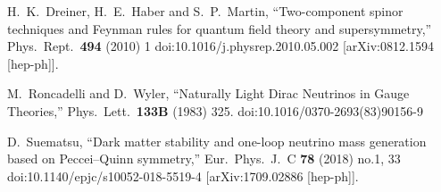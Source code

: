 \begin{thebibliography}{99}
  H.~K.~Dreiner, H.~E.~Haber and S.~P.~Martin,
  ``Two-component spinor techniques and Feynman rules for quantum field theory and supersymmetry,''
  Phys.\ Rept.\  {\bf 494} (2010) 1
  doi:10.1016/j.physrep.2010.05.002
  [arXiv:0812.1594 [hep-ph]].

  M.~Roncadelli and D.~Wyler,
  ``Naturally Light Dirac Neutrinos in Gauge Theories,''
  Phys.\ Lett.\  {\bf 133B} (1983) 325.
  doi:10.1016/0370-2693(83)90156-9
  
  D.~Suematsu,
  ``Dark matter stability and one-loop neutrino mass generation based on Peccei–Quinn symmetry,''
  Eur.\ Phys.\ J.\ C {\bf 78} (2018) no.1,  33
  doi:10.1140/epjc/s10052-018-5519-4
  [arXiv:1709.02886 [hep-ph]].

  
\end{thebibliography}
